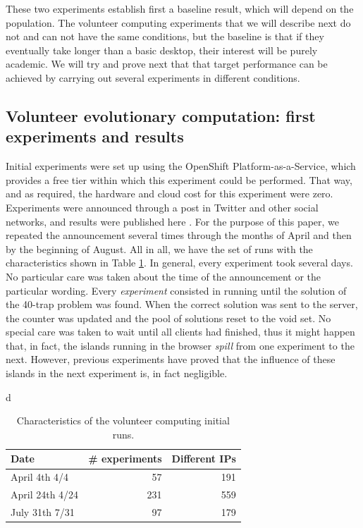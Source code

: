 \documentclass[journal,onecolumn]{IEEEtran}
\begin{document}
These two experiments establish first a baseline result, which will
depend on the population. The volunteer computing experiments that we
will describe next do not and can not have the same conditions, but
the baseline is that if they eventually take longer than a basic
desktop, their interest will be purely academic. We will try and
prove next that that target performance can be achieved by carrying
out several experiments in different conditions.

\subsection{Volunteer evolutionary computation: first experiments and results}

Initial experiments were set up using the OpenShift
Platform-as-a-Service, which provides a free tier within which this
experiment could be performed. That way, and as required, the hardware
and cloud cost for this experiment were zero. Experiments were
announced through a post in Twitter and other social networks, and
results were published here \cite{DBLP:conf/gecco/GuervosG15}. For the
purpose of this paper, we repeated the announcement several times
through the months of April and then by the beginning of August. All
in all, we have the set of runs with the characteristics shown in
Table \ref{tab:runs}. In general, every experiment took several
days. No particular care was taken about the time of the announcement
or the particular wording. Every {\em experiment} consisted in running
until the solution of the 40-trap problem was found. When the correct
solution was sent to the server, the counter was updated and the pool
of solutions reset to the void set. No special care was taken to wait
until all clients had finished, thus it might happen that, in fact,
the islands running in the browser {\em spill} from one experiment to
the next. However, previous experiments have proved that the influence
of these islands in the next experiment is, in fact negligible.
%
\begin{table}d
\caption{Characteristics of the volunteer computing initial runs. \label{tab:runs}}
\begin{center}
\begin{tabular}{l|rr}
\hline
Date & \# experiments & Different IPs \\
\hline 
April 4th 4/4 & 57 & 191 \\
April 24th 4/24 &  231 & 559 \\
July 31th 7/31 & 97 & 179 \\
\hline 
\end{tabular}
\end{center}
\end{table}
\end{document}

